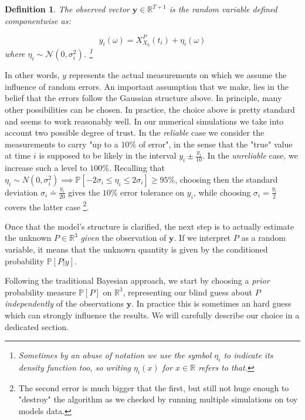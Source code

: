 \documentclass[8pt]{article}
\newtheorem{definition}{Definition}
\begin{document}
\begin{definition}
	The \emph{observed vector} $\textbf{y} \in \mathbb{R}^{T+1}$
	is the random variable defined componentwise as:

\begin{equation}
	y_i(\omega) = X^P_{X_0} (t_i) + \eta_i(\omega)
\end{equation}
where $\eta_i \sim \mathcal{N}(0, \sigma^2_i)$.
\footnote{Sometimes by an abuse of notation 
we use the symbol $\eta_i$ to indicate its density function too,
so writing $\eta_i(x)$ for $x \in \mathbb{R}$ refers to that.}
\end{definition}


In other words, $y$ represents the actual measurements on which we
assume the influence of random errors. An important assumption that
we make, lies in the belief that the errors follow the
Gaussian structure above. In principle, many other possibilities
can be chosen.
In practice, the choice above is pretty standard and 
seems to work reasonably well.
In our numerical simulations we take into account two
possible degree of trust. In the \emph{reliable}
case we consider the measurements
to carry "up to a $10\%$ of error", in the sense that
the "true" value at time $i$ is supposed to be likely in the interval
$y_i \pm \frac{y_i}{10}$. In the \emph{unreliable}
case, we increase such a level to $100\%$.
Recalling that
$\eta_i \sim N(0, \sigma_i^2) \implies 
\mathbb{P}[ - 2 \sigma_i \leq \eta_i \leq 2 \sigma_i] \geq 95\%$, choosing
then the standard deviation
$\sigma_i \doteq \frac{y_i}{20}$ gives the $10\%$ error
tolerance on $y_i$, while choosing $\sigma_i = \frac{y_i}{2}$ covers
the latter case \footnote{The second error is much bigger that the first,
but still not huge enough to "destroy" the algorithm as we checked by
running multiple simulations on toy models data.}.


Once that the model's structure is clarified,
the next step is to actually estimate
the unknown $P \in \mathbb{R}^3$ \emph{given} the observation of $\textbf{y}$.
If we interpret $P$ as a random variable, it means that 
the unknown quantity is given by the conditioned
probability $\mathbb{P}[P | y]$.


Following the traditional Bayesian approach, 
we start by choosing a \emph{prior} probability measure $\mathbb{P}[P]$ on 
$\mathbb{R}^3$, representing our blind guess about 
$P$ \emph{independently} of the 
observations $\textbf{y}$. In practice this is sometimes an hard guess
which can strongly influence the results.
We will carefully describe our choice in a dedicated section.
\end{document}
